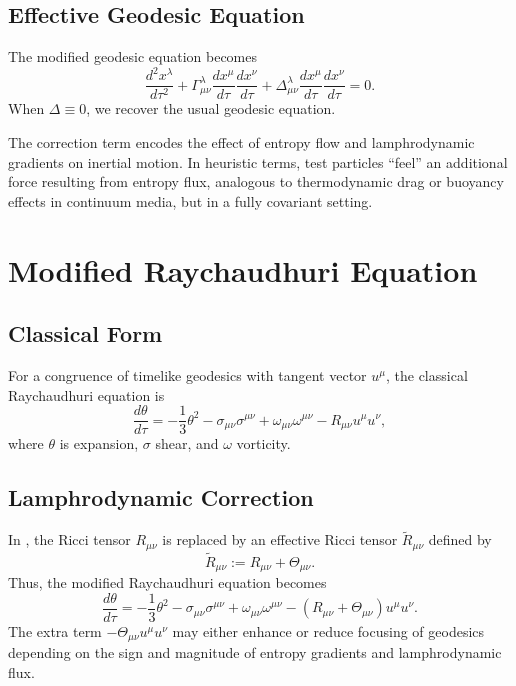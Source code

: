 \subsection{Effective Geodesic Equation}

The modified geodesic equation becomes
\begin{equation}
\label{eq:modified-geodesic}
  \frac{d^2 x^\lambda}{d\tau^2}
  + \Gamma^\lambda_{\mu\nu}
  \frac{dx^\mu}{d\tau}\frac{dx^\nu}{d\tau}
  + \Delta^\lambda_{\mu\nu}
  \frac{dx^\mu}{d\tau}\frac{dx^\nu}{d\tau}
  = 0.
\end{equation}
When $\Delta\equiv 0$, we recover the usual geodesic equation.

\begin{remark}[Interpretation]
The correction term encodes the effect of entropy flow and lamphrodynamic
gradients on inertial motion. In heuristic terms, test particles
``feel'' an additional force resulting from entropy flux, analogous to
thermodynamic drag or buoyancy effects in continuum media, but in a fully
covariant setting.
\end{remark}

\section{Modified Raychaudhuri Equation}

\subsection{Classical Form}

For a congruence of timelike geodesics with tangent vector $u^\mu$, the
classical Raychaudhuri equation is
\[
  \frac{d\theta}{d\tau}
  = -\frac{1}{3}\theta^2 - \sigma_{\mu\nu}\sigma^{\mu\nu}
  + \omega_{\mu\nu}\omega^{\mu\nu}
  - R_{\mu\nu} u^\mu u^\nu,
\]
where $\theta$ is expansion, $\sigma$ shear, and $\omega$ vorticity.

\subsection{Lamphrodynamic Correction}

In \rsvpabbr{}, the Ricci tensor $R_{\mu\nu}$ is replaced by an effective
Ricci tensor $\tilde{R}_{\mu\nu}$ defined by
\[
  \tilde{R}_{\mu\nu}
  := R_{\mu\nu} + \Theta_{\mu\nu}.
\]
Thus, the modified Raychaudhuri equation becomes
\begin{equation}
\label{eq:raychaudhuri-modified}
  \frac{d\theta}{d\tau}
  = -\frac{1}{3}\theta^2 - \sigma_{\mu\nu}\sigma^{\mu\nu}
  + \omega_{\mu\nu}\omega^{\mu\nu}
  - (R_{\mu\nu} + \Theta_{\mu\nu}) u^\mu u^\nu.
\end{equation}
The extra term $-\Theta_{\mu\nu}u^\mu u^\nu$ may either enhance or reduce
focusing of geodesics depending on the sign and magnitude of entropy
gradients and lamphrodynamic flux.

